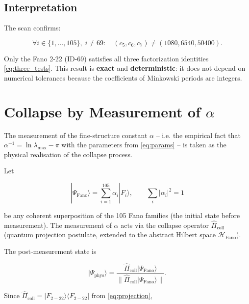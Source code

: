 \documentclass[12pt]{article}
\begin{document}
\subsection{Interpretation}

The scan confirms:

\begin{equation}
\boxed{
\forall i \in \{1,\dots,105\},\; i \neq 69: \quad (c_5,c_6,c_7) \neq (1080,6540,50400).
}
\label{eq:scan_result}
\end{equation}

Only the Fano 2-22 (ID-69) satisfies all three factorization identities
\eqref{eq:three_tests}. This result is \textbf{exact} and \textbf{deterministic}:
it does not depend on numerical tolerances because the coefficients of Minkowski
periods are integers.

\section{Collapse by Measurement of \(\alpha\)}

The measurement of the fine-structure constant \(\alpha\) – i.e. the empirical
fact that \(\alpha^{-1} = \ln\lambda_{\max} - \pi\) with the parameters from
\eqref{eq:params} – is taken as the physical realisation of the collapse process.

Let

\begin{equation}
|\Psi_{\text{Fano}}\rangle = \sum_{i=1}^{105} \alpha_i |F_i\rangle,\qquad
\sum_i |\alpha_i|^2 = 1
\label{eq:superposition}
\end{equation}

be any coherent superposition of the 105 Fano families (the initial state
before measurement). The measurement of \(\alpha\) acts via the collapse
operator \(\hat{\Pi}_{\text{coll}}\) (quantum projection postulate, extended
to the abstract Hilbert space \(\mathcal{H}_{\text{Fano}}\)).

The post‑measurement state is

\begin{equation}
|\Psi_{\text{phys}}\rangle = \frac{ \hat{\Pi}_{\text{coll}} |\Psi_{\text{Fano}}\rangle }
{ \| \hat{\Pi}_{\text{coll}} |\Psi_{\text{Fano}}\rangle \| }.
\label{eq:post_measurement}
\end{equation}

Since \(\hat{\Pi}_{\text{coll}} = |F_{2-22}\rangle\langle F_{2-22}|\) from
\eqref{eq:projection},
\end{document}
